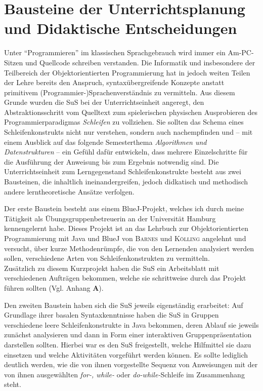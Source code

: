 \documentclass[paper=a4, DIV=13, BCOR=12mm, twoside=on, onecolumn=on, open = any, titlepage =on, parskip =half-, headsepline = on, footsepline = on, chapterprefix = on, sectionprefix = on, appendixprefix = off, fontsize = 11pt, numbers = noenddot, abstract = off]{scrreprt}
\begin{document}
\par \singlespacing
 \section{Bausteine der Unterrichtsplanung und Didaktische Entscheidungen}
\onehalfspacing
Unter "`Programmieren"' im klassischen Sprachgebrauch wird immer ein Am-PC-Sitzen und Quellcode schreiben verstanden. Die Informatik und insbesondere der Teilbereich der Objektorientierten Programmierung hat in jedoch weiten Teilen der Lehre bereits den Anspruch, syntaxübergreifende Konzepte anstatt primitivem (Programmier-)Sprachenverständnis zu vermitteln.  Aus diesem Grunde wurden die SuS bei der Unterrichtseinheit angeregt, den Abstraktionsschritt vom Quelltext zum spielerischen physischen Ausprobieren des Programmierparadigmas \emph{Schleifen} zu vollziehen. Sie sollten das Schema eines Schleifenkonstrukts nicht nur verstehen, sondern auch nachempfinden und -- mit einem Ausblick auf das folgende Semesterthema \emph{Algorithmen und Datenstrukturen} -- ein Gefühl dafür entwickeln, dass mehrere Einzelschritte für die Ausführung der Anweisung bis zum Ergebnis notwendig sind.  
Die Unterrichtseinheit zum Lerngegenstand Schleifenkonstrukte besteht aus zwei Bausteinen, die inhaltlich ineinandergreifen, jedoch didkatisch und methodisch andere lerntheoretische Ansätze verfolgen. 

Der erste Baustein besteht aus einem BlueJ-Projekt, welches ich durch meine Tätigkeit als Übungsgruppenbetreuerin an der Universität Hamburg kennengelernt habe. Dieses Projekt ist an das Lehrbuch zur Objektorientierten Programmierung mit Java und BlueJ von \textsc{Barnes} und \textsc{Kölling} angelehnt und versucht, über kurze Methodenrümpfe, die von den Lernenden analysiert werden sollen, verschiedene Arten von Schleifenkonstrukten zu vermitteln.\\
Zusätzlich zu diesem Kurzprojekt haben die SuS ein Arbeitsblatt mit verschiedenen Aufträgen bekommen, welche sie schrittweise durch das Projekt führen sollten (Vgl. Anhang \textbf{A}).

Den zweiten Baustein haben sich die SuS jeweils eigenständig erarbeitet: Auf Grundlage ihrer basalen Syntaxkenntnisse haben die SuS in Gruppen verschiedene leere Schleifenkonstrukte in Java bekommen, deren Ablauf sie jeweils zunächst analysieren und dann in Form einer interaktiven Gruppenpräsentation darstellen sollten. Hierbei war es den SuS freigestellt, welche Hilfmittel sie dazu einsetzen und welche Aktivitäten vorgeführt werden können. Es sollte lediglich deutlich werden, wie die von ihnen vorgestellte Sequenz von Anweisungen mit der von ihnen ausgewählten \emph{for-, while-} oder \emph{do-while-}Schleife im Zusammenhang steht.
\end{document}
